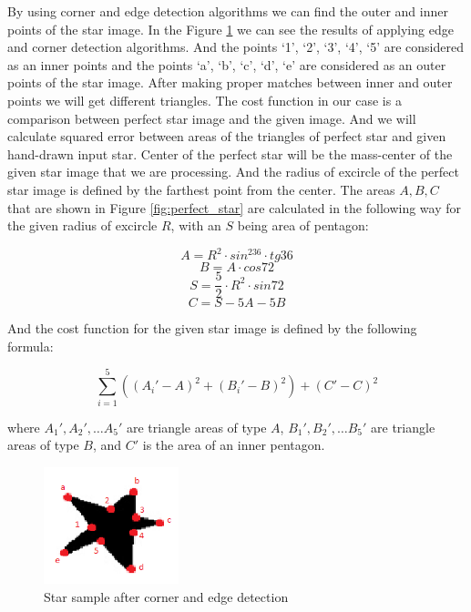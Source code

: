 By using corner and edge detection algorithms \cite{Li} we can find the outer and inner points of the star image. In the Figure \ref{fig:after_corner_detection} we can see the results of applying edge and corner detection algorithms. And the points ‘1’, ‘2’, ‘3’, ‘4’, ‘5’ are considered as an inner points and the points ‘a’, ‘b’, ‘c’, ‘d’, ‘e’ are considered as an outer points of the star image. After making proper matches between inner and outer points we will get different triangles. The cost function in our case is a comparison between perfect star image and the given image. And we will calculate squared error between areas of the triangles of perfect star and given hand-drawn input star. Center of the perfect star will be the mass-center of the given star image that we are processing. And the radius of excircle of the perfect star image is defined by the farthest point from the center. The areas $A, B, C$ that are shown in Figure \ref{fig:perfect_star} are calculated in the following way for the given radius of excircle $R$, with an $S$ being area of pentagon: 

\begin{equation}
    A = R^2 \cdot sin^236 \cdot tg36
\end{equation}
\begin{equation}
    B = A \cdot cos72
\end{equation}
\begin{equation}
    S = \frac{5}{2} \cdot R^2 \cdot sin72
\end{equation}
\begin{equation}
    C = S - 5A - 5B
\end{equation}

And the cost function for the given star image is defined by the following formula:

\begin{equation}
    \sum_{i=1}^{5}(({A_i}' - A)^2 + ({B_i}' - B)^2) + ({C}' - C)^2
\end{equation}

where ${A_1}', {A_2}', \dots {A_5}'$ are triangle areas of type $A$, ${B_1}', {B_2}', \dots {B_5}'$ are triangle areas of type $B$, and ${C}'$ is the area of an inner pentagon.

\begin{figure}[h!]
    \centering
    \includegraphics[width={0.35\textwidth}]{Figures/after_corner_detection}
    \caption{Star sample after corner and edge detection}
    \label{fig:after_corner_detection}
\end{figure}

